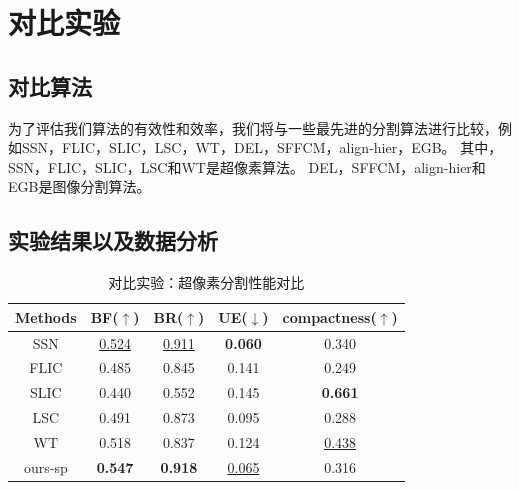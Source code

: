 \section{对比实验}

\subsection{对比算法}

为了评估我们算法的有效性和效率，我们将与一些最先进的分割算法进行比较，例如SSN，FLIC，SLIC，LSC，WT，DEL，SFFCM，align-hier，EGB。 其中，SSN，FLIC，SLIC，LSC和WT是超像素算法。 DEL，SFFCM，align-hier和EGB是图像分割算法。

\subsection{实验结果以及数据分析}

\begin{table}[htbp]
\caption{对比实验：超像素分割性能对比}\label{tab:table3}
\vspace{0.5em}\centering\wuhao
\begin{tabular}{ccccc}
\toprule[1.5pt]
Methods & BF($\uparrow$) & BR($\uparrow$) & UE($\downarrow$) & compactness($\uparrow$) \\
\midrule[1pt]
SSN     & \underline{0.524} & \underline{0.911} & \textbf{0.060}    & 0.340 \\
FLIC    & 0.485             & 0.845             & 0.141             & 0.249\\
SLIC    & 0.440             & 0.552             & 0.145             & \textbf{0.661}\\
LSC     & 0.491             & 0.873             & 0.095             & 0.288\\
WT      & 0.518             & 0.837             & 0.124             & \underline{0.438} \\
ours-sp & \textbf{0.547}    & \textbf{0.918}    & \underline{0.065} & 0.316\\
\bottomrule[1.5pt]
\end{tabular}
\end{table}

